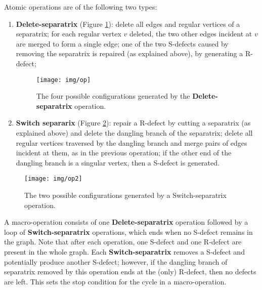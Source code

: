 \documentclass[11pt,a4paper]{article}
\begin{document}
Atomic operations are of the following two types:
\begin{enumerate}
\item \textbf{Delete-separatrix} (Figure \ref{fig:op}): delete all edges and regular vertices of a separatrix; for each regular vertex $v$ deleted, the two other edges incident at $v$ are merged to form a single edge; one of the two S-defects caused by removing the separatrix is repaired (as explained above), by generating a R-defect; 

\begin{figure}
\centering
\mbox{}
\hfill
\centerline{\texttt{[image: img/op]}}


\hfill\mbox{}
\caption{\label{fig:op} The four possible configurations generated by the \textbf{Delete-separatrix} operation.
}
\end{figure}

\item \textbf{Switch separarix} (Figure \ref{fig:op2}): repair a R-defect by cutting a separatrix (as explained above) and delete the dangling branch of the separatrix; delete all regular vertices traversed by the dangling branch and merge pairs of edges incident at them, as in the previous operation; if the other end of the dangling branch is a singular vertex, then a S-defect is generated.
\end{enumerate}

\begin{figure}
\centering
\mbox{}
\hfill
\texttt{[image: img/op2]}


\hfill\mbox{}
\caption{\label{fig:op2} The two possible configurations generated by a Switch-separatrix operation.
}
\end{figure}

A macro-operation consists of one \textbf{Delete-separatrix} operation followed by a loop of \textbf{Switch-separatrix} operations, which ends when no S-defect remains in the graph.
Note that after each operation, one S-defect and one R-defect are present in the whole graph. 
Each \textbf{Switch-separatrix} removes a S-defect and potentially produce another S-defect; however, if the dangling branch of separatrix removed by this operation ends at the (only) R-defect, then no defects are left. 
This sets the stop condition for the cycle in a macro-operation.
\end{document}
